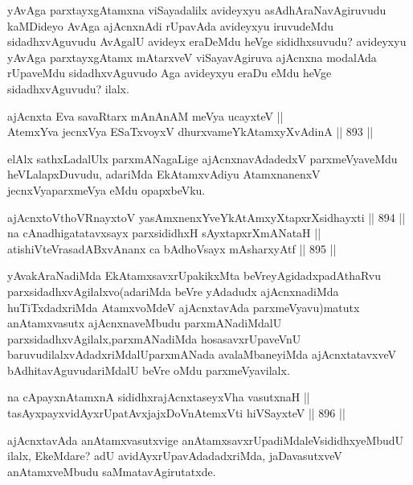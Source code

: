 \begin{artha}
yAvAga parxtayxgAtamxna viSayadalilx avideyxyu asAdhAraNavAgiruvudu kaMDideyo AvAga ajAcnxnAdi rUpavAda avideyxyu iruvudeMdu sidadhxvAguvudu AvAgalU avideyx eraDeMdu heVge sididhxsuvudu? avideyxyu yAvAga parxtayxgAtamx mAtarxveV viSayavAgiruva ajAcnxna modalAda rUpaveMdu sidadhxvAguvudo Aga avideyxyu eraDu eMdu heVge sidadhxvAguvudu? ilalx.
\end{artha}

\begin{shl}
ajAcnxta Eva savaRtarx mAnAnAM meVya ucayxteV || \\
AtemxYva jecnxVya ESaTxvoyxV dhurxvameYkAtamxyXvAdinA \hfill || 893 ||  
\end{shl}

\begin{artha}
elAlx sathxLadalUlx parxmANagaLige ajAcnxnavAdadedxV parxmeVyaveMdu heVLalapxDuvudu, adariMda EkAtamxvAdiyu AtamxnanenxV jecnxVya\break parxmeVya eMdu opapxbeVku.
\end{artha}

\begin{shl}
ajAcnxtoV\s thoVR\s nayxtoV yasAmxnenxYveYkAtAmxyXtapxrXsidhayxti \hfill || 894 ||  \\
na cAnadhigatatavxsayx parxsididhxH sAyxtapxrXmANataH || \\
atishiVteVrasadABxvAnanx ca bAdhoV\s sayx mAsharxyAtf \hfill || 895 ||  
\end{shl}

\begin{artha}
yAvakAraNadiMda EkAtamxsavxrUpakikxMta beVreyAgidadx\break padAthaRvu parxsidadhxvAgilalxvo(adariMda beVre yAdadudx ajAcnxnadiMda huTiTxdadxriMda AtamxvoMdeV ajAcnxtavAda parxmeVyavu)matutx anAtamxvasutx ajAcnxnaveMbudu parxmANadiMdalU parxsidadhxvAgilalx,\break parxmANadiMda hosasavxrUpaveVnU baruvudilalxvAdadxriMdalU\break parxmANada avalaMbaneyiMda ajAcnxtatavxveV bAdhitavAguvuda\-\break riMdalU beVre oMdu parxmeVyavilalx.
\end{artha}

\begin{shl}
na cApayxnAtamxnA sididhxrajAcnxtaseyxVha vasutxnaH || \\
tasAyxpayxvidAyxrUpatAvxjajxDoV\s nAtemxVti hiVSayxteV \hfill || 896 ||  
\end{shl}

\begin{artha}
ajAcnxtavAda anAtamxvasutxvige anAtamxsavxrUpadiMdaleV\break sididhxyeMbudU ilalx, EkeMdare? adU avidAyxrUpavAdadadxriMda, jaDavasutxveV anAtamxveMbudu saMmatavAgirutatxde.
\end{artha}

